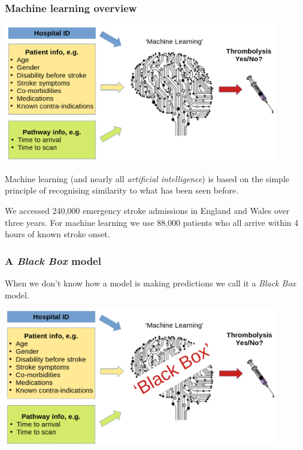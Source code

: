 \documentclass{beamer}
\begin{document}

\begin{frame}
\frametitle{Machine learning overview}
\begin{center}
\includegraphics[width=0.90\textwidth]{./images/ml_model_high_level}
\end{center}

\footnotesize
Machine learning (and nearly all \emph{artificial intelligence}) is based on the simple principle of recognising similarity to what has been seen before.
\vspace{3mm}

We accessed 240,000 emergency stroke admissions in England and Wales over three years. For machine learning we use 88,000 patients who all arrive within 4 hours of known stroke onset.
\end{frame}



\begin{frame}
\frametitle{A \emph{Black Box} model}
When we don't know how a model is making predictions we call it a \emph{Black Box} model.
\vspace{4mm}
\begin{center}
\includegraphics[width=0.90\textwidth]{./images/black_box}
\end{center}
\end{frame}
\end{document}
